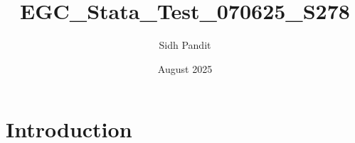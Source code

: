 \documentclass{article}
\title{EGC_Stata_Test_070625_S278}
\author{Sidh Pandit}
\date{August 2025}
\begin{document}
\maketitle

\section{Introduction}
\end{document}
